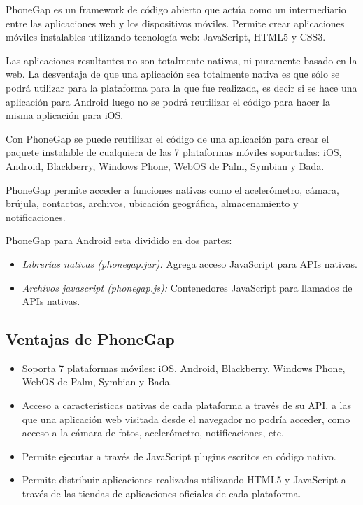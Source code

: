 PhoneGap es un \gls{framework} de código abierto que actúa como un intermediario entre las aplicaciones web y los dispositivos móviles. Permite crear aplicaciones móviles instalables utilizando tecnología web: \gls{JavaScript}, \gls{HTML}5 y \gls{CSS}3.

Las aplicaciones resultantes no son totalmente nativas, ni puramente basado en la web. La desventaja de que una aplicación sea totalmente nativa es que sólo se podrá utilizar para la plataforma para la que fue realizada, es decir si se hace una aplicación para Android luego no se podrá reutilizar el código para hacer la misma aplicación para iOS.

Con PhoneGap se puede reutilizar el código de una aplicación para crear el paquete instalable de cualquiera de las 7 plataformas móviles soportadas: iOS, Android, Blackberry, Windows Phone, WebOS de Palm, Symbian y Bada.

PhoneGap permite acceder a funciones nativas como el acelerómetro, cámara, brújula, contactos, archivos, ubicación geográfica, almacenamiento  y notificaciones.

PhoneGap para Android esta dividido en dos partes:

\begin{itemize}
    \item \emph{Librerías nativas (phonegap.jar):} Agrega acceso JavaScript para APIs nativas.
    
    \item \emph{Archivos javascript (phonegap.js):} Contenedores JavaScript para llamados de APIs nativas.
    
   
 \end{itemize}
\subsection{Ventajas de PhoneGap}

\begin{itemize}

    \item Soporta 7 plataformas móviles: iOS, Android, Blackberry, Windows Phone, WebOS de Palm, Symbian y Bada.
    
    \item Acceso a características nativas de cada plataforma a través de su API, a las que una aplicación web visitada desde el navegador no podría acceder, como acceso a la cámara de fotos, acelerómetro, notificaciones, etc.
    
    \item Permite ejecutar a través de JavaScript plugins escritos en código nativo.
    
    \item Permite distribuir aplicaciones realizadas utilizando HTML5 y JavaScript a través de las tiendas de aplicaciones oficiales de cada plataforma.
    
    \end{itemize}
